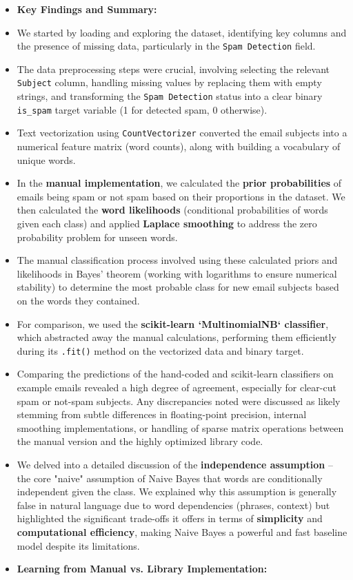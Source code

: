 \documentclass[12pt,a4paper]{article}
\begin{document}
\begin{itemize}
    \item \textbf{Key Findings and Summary:}
    \item We started by loading and exploring the dataset, identifying key columns and the presence of missing data, particularly in the \texttt{Spam Detection} field.
    \item The data preprocessing steps were crucial, involving selecting the relevant \texttt{Subject} column, handling missing values by replacing them with empty strings, and transforming the \texttt{Spam Detection} status into a clear binary \texttt{is\_spam} target variable (1 for detected spam, 0 otherwise).
    \item Text vectorization using \texttt{CountVectorizer} converted the email subjects into a numerical feature matrix (word counts), along with building a vocabulary of unique words.
    \item In the \textbf{manual implementation}, we calculated the \textbf{prior probabilities} of emails being spam or not spam based on their proportions in the dataset. We then calculated the \textbf{word likelihoods} (conditional probabilities of words given each class) and applied \textbf{Laplace smoothing} to address the zero probability problem for unseen words.
    \item The manual classification process involved using these calculated priors and likelihoods in Bayes' theorem (working with logarithms to ensure numerical stability) to determine the most probable class for new email subjects based on the words they contained.
    \item For comparison, we used the \textbf{scikit-learn `MultinomialNB` classifier}, which abstracted away the manual calculations, performing them efficiently during its \texttt{.fit()} method on the vectorized data and binary target.
    \item Comparing the predictions of the hand-coded and scikit-learn classifiers on example emails revealed a high degree of agreement, especially for clear-cut spam or not-spam subjects. Any discrepancies noted were discussed as likely stemming from subtle differences in floating-point precision, internal smoothing implementations, or handling of sparse matrix operations between the manual version and the highly optimized library code.
    \item We delved into a detailed discussion of the \textbf{independence assumption} – the core "naive" assumption of Naive Bayes that words are conditionally independent given the class. We explained why this assumption is generally false in natural language due to word dependencies (phrases, context) but highlighted the significant trade-offs it offers in terms of \textbf{simplicity} and \textbf{computational efficiency}, making Naive Bayes a powerful and fast baseline model despite its limitations.
    \item \textbf{Learning from Manual vs. Library Implementation:}
\end{itemize}
\end{document}
